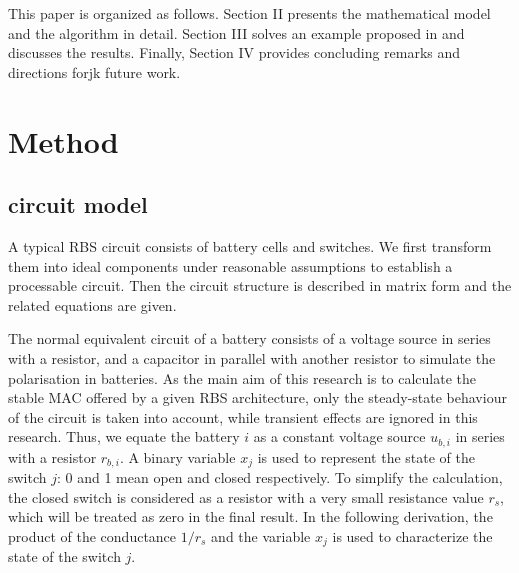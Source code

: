 \documentclass{article}
\begin{document}
This paper is organized as follows. 
Section II presents the mathematical model and the algorithm in detail.
Section III solves an example proposed in \cite{kimDESADependableEfficient2012}and discusses the results. 
Finally, Section IV provides concluding remarks and directions forjk future work.

\section{Method}

\subsection{circuit model}

A typical RBS circuit consists of battery cells and switches.
We first transform them into ideal components under reasonable assumptions to establish a processable circuit.
Then the circuit structure is described in matrix form and the related equations are given.


The normal equivalent circuit of a battery consists of a voltage source in series with a resistor, and a capacitor in parallel with another resistor to simulate the polarisation in batteries.
As the main aim of this research is to calculate the stable MAC offered by a given RBS architecture, only the steady-state behaviour of the circuit is taken into account, while transient effects are ignored in this research.
Thus, we equate the battery $i$ as a constant voltage source $u_{b,i}$ in series with a resistor $r_{b,i}$.
A binary variable $x_j$ is used to represent the state of the switch $j$: 0 and 1 mean open and closed respectively.
To simplify the calculation, the closed switch is considered as a resistor with a very small resistance value $r_s$, which will be treated as zero in the final result.
In the following derivation, the product of the conductance $1/r_s$ and the variable $x_j$ is used to characterize the state of the switch $j$.
\end{document}
